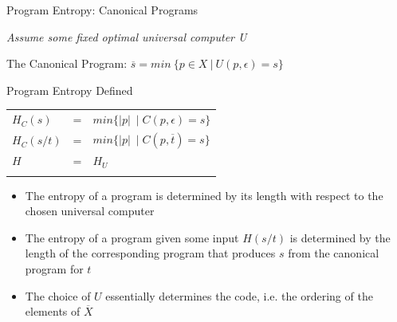 \documentclass{beamer}
\begin{document}
\begin{frame}{Program Entropy: Canonical Programs}

\emph{Assume some fixed optimal universal computer U}

\medskip

\begin{structure}{The Canonical Program: }
 $\overline{s} = min\ \{p \in X\ \vert\ U(p, \epsilon) = s\}$
\end{structure}

\medskip

\begin{structure}{Program Entropy Defined}\\
\begin{tabular}[t]{lll}
 $H_C(s)$ &=& $min \{ \vert p \vert\ \mid C(p, \epsilon) = s \}$\\
 $H_C(s/t)$ &=& $min \{ \vert p \vert\ \mid C(p, \overline{t}) = s \}$\\
 $H$ &=& $H_U$\\
 \color{red}{$\implies H(s) = \vert \overline{s} \vert$}
\end{tabular}
\end{structure}

\medskip

\begin{itemize}
 \item{The entropy of a program is determined by its length with respect to
       the chosen universal computer}

 \item{The entropy of a program given some input $H(s/t)$ is determined
       by the length of the corresponding program that produces $s$ from the
       canonical program for $t$}

 \item{The choice of $U$ essentially determines the code, i.e. the ordering
       of the elements of $\overline{X}$}
       
\end{itemize}

\end{frame}


\end{document}
